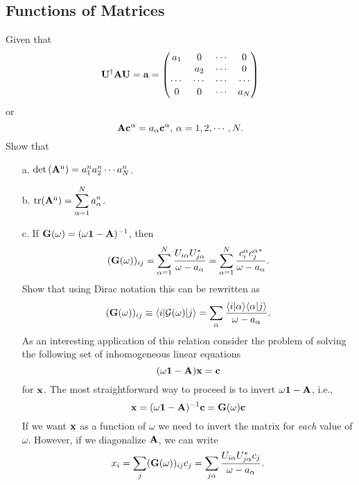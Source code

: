 \documentclass[a4paper]{book}
\newcommand\tr[1]{\mathrm{tr(#1)}}
\renewcommand\det[1]{\mathrm{det\left(#1\right)}}
\newcommand{\A}{{\bf A}}
\newcommand{\I}{{\bf 1}}
\newcommand{\U}{{\bf U}}
\begin{document}
	\subsection{Functions of Matrices}
	
	\begin{exercise}
	Given that
	\begin{equation*}
		\U^\dagger \A \U = \bf{a} = \begin{pmatrix} a_1 & 0 & \cdots & 0 \\ & a_2 & \cdots & 0 \\ \cdots & \cdots & \cdots & \cdots \\ 0 & 0 & \cdots & a_N \end{pmatrix}
	\end{equation*}
	or
	\begin{equation*}
		\A {\bf c^\alpha} = a_\alpha {\bf c^\alpha} , \, \alpha = 1,2,\cdots, N.
	\end{equation*}
	Show that
	\begin{enumerate}
	
	\item[a.] $\det{\A^n}=a^n_1 a^n_2 \cdots a^n_N$.

	\item[b.] $\tr{\A^n}=\displaystyle\sum_{\alpha=1}^N a^n_\alpha$.
	
	\item[c.] If ${\bf G}(\omega) = (\omega\I - \A)^{-1}$, then
	\begin{equation*}
		({\bf G}(\omega))_{ij} = \sum_{\alpha=1}^N \frac{U_{i\alpha}U^*_{j\alpha}}{\omega-a_\alpha} = \sum_{\alpha=1}^N \frac{c^\alpha_i {c^\alpha_j}^*}{\omega-a_\alpha}.
	\end{equation*}
	Show that using Dirac notation this can be rewritten as
	\begin{equation*}
		({\bf G}(\omega))_{ij} \equiv \langle i | \mathcal{G}(\omega) | j \rangle = \sum_{\alpha} \frac{\langle i | \alpha \rangle \langle \alpha | j \rangle }{\omega - a_\alpha}.
	\end{equation*}
	As an interesting application of this relation consider the problem of solving the following set of inhomogeneous linear equations
	\begin{equation*}
		(\omega\I-\A){\bf x} = {\bf c}
	\end{equation*}
	for ${\bf x}$. The most straightforward way to proceed is to invert $\omega \I - \A$, i.e., 
	\begin{equation*}
		{\bf x} = (\omega \I - \A)^{-1} {\bf c} = {\bf G}(\omega) {\bf c}
	\end{equation*}
	If we want ${\bf x}$ as a function of $\omega$ we need to invert the matrix for {\it each} value of $\omega$. However, if we diagonalize $\A$, we can write
	\begin{equation*}
		x_i = \sum_j ({\bf G}(\omega))_{ij}c_j = \sum_{j\alpha} \frac{ U_{i\alpha}U^*_{j\alpha} c_j}{\omega-a_\alpha}.
	\end{equation*}
	\end{enumerate}
	\end{exercise}
	
\end{document}
